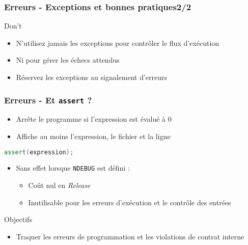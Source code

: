 \documentclass[C++.tex]{subfiles}
\begin{document}
\begin{frame}
	\frametitle{Erreurs - Exceptions et bonnes pratiques\titlehfill{}2/2}
	\begin{alertblock}{Don't}
		\begin{itemize}
			\item N'utilisez jamais les exceptions pour contrôler le flux d'exécution
			\item Ni pour gérer les \og échecs attendus\fg{}


			\item Réservez les exceptions au signalement d'erreurs
		\end{itemize}
	\end{alertblock}
\end{frame}

\begin{frame}[fragile]
	\frametitle{Erreurs - Et \lstinline|assert| ?}
	\begin{itemize}
		\item Arrête le programme si l'expression est évalué à 0
		\item Affiche au moins l'expression, le fichier et la ligne
	\end{itemize}

	\begin{lstlisting}[language=C++]
assert(expression);\end{lstlisting}

	\begin{itemize}
		\item Sans effet lorsque \lstinline|NDEBUG| est défini :
		\begin{itemize}
			\item Coût nul en \textit{Release}
			\item Inutilisable pour les erreurs d'exécution et le contrôle des entrées
		\end{itemize}
	\end{itemize}

	\begin{block}{Objectifs}
		\begin{itemize}
			\item Traquer les erreurs de programmation et les violations de contrat interne
		\end{itemize}
	\end{block}
\end{frame}
\end{document}
